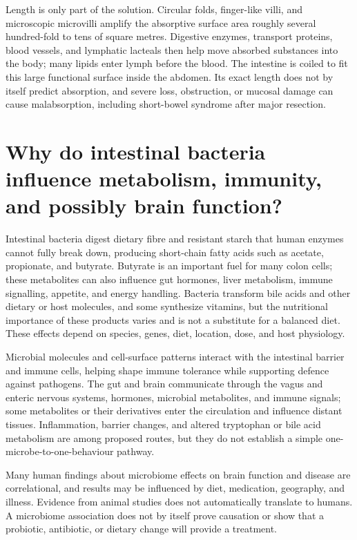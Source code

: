 \documentclass[11pt,oneside]{report}
\begin{document}
Length is only part of the solution. Circular folds, finger-like villi, and
microscopic microvilli amplify the absorptive surface area roughly several
hundred-fold to tens of square metres. Digestive enzymes,
transport proteins, blood vessels, and lymphatic lacteals then help move
absorbed substances into the body; many lipids enter lymph before the blood.
The intestine is coiled to fit this large functional surface inside the
abdomen. Its exact length does not by itself predict absorption, and severe
loss, obstruction, or mucosal damage can cause malabsorption, including
short-bowel syndrome after major resection.

\section{Why do intestinal bacteria influence metabolism, immunity, and possibly brain function?}

Intestinal bacteria digest dietary fibre and resistant starch that human
enzymes cannot fully break down, producing short-chain fatty acids such as
acetate, propionate, and butyrate. Butyrate is an important fuel for many colon
cells; these metabolites can also influence gut hormones, liver metabolism,
immune signalling, appetite, and energy handling. Bacteria transform bile
acids and other dietary or host molecules, and some synthesize vitamins, but
the nutritional importance of these products varies and is not a substitute
for a balanced diet. These effects depend on species, genes, diet, location,
dose, and host physiology.

Microbial molecules and cell-surface patterns interact with the intestinal
barrier and immune cells, helping shape immune tolerance while supporting
defence against pathogens. The gut and brain communicate through the vagus and
enteric nervous systems, hormones, microbial metabolites, and immune signals;
some metabolites or their derivatives enter the circulation and influence
distant tissues. Inflammation, barrier changes, and altered tryptophan or bile
acid metabolism are among proposed routes, but they do not establish a simple
one-microbe-to-one-behaviour pathway.

Many human findings about microbiome effects on brain function and disease are
correlational, and results may be influenced by diet, medication, geography,
and illness. Evidence from animal studies does not automatically translate to
humans. A microbiome association does not by itself prove causation or show
that a probiotic, antibiotic, or dietary change will provide a treatment.
\end{document}

